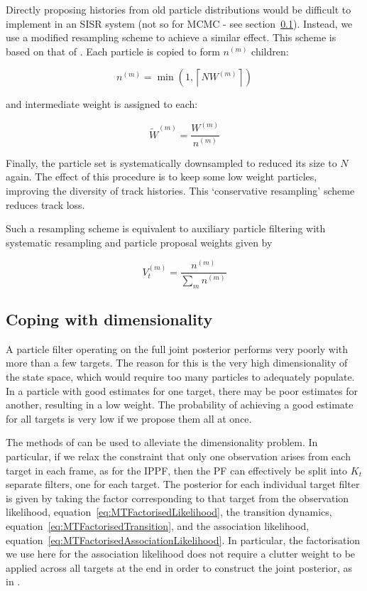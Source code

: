 Directly proposing histories from old particle distributions would be difficult to implement in an SISR system (not so for MCMC - see section~\ref{}). Instead, we use a modified resampling scheme to achieve a similar effect. This scheme is based on that of \cite{Godsill2007}. Each particle is copied to form $n^{(m)}$ children:

\begin{equation}
n^{(m)} = \min(1,\left\lceil N W^{(m)} \right\rceil)
\label{eq:}
\end{equation}

and intermediate weight is assigned to each:

\begin{equation}
\tilde{W}^{(m)} = \frac{W^{(m)}}{n^{(m)}}
\label{eq:}
\end{equation}

Finally, the particle set is systematically downsampled to reduced its size to $N$ again. The effect of this procedure is to keep some low weight particles, improving the diversity of track histories. This `conservative resampling' scheme reduces track loss.

Such a resampling scheme is equivalent to auxiliary particle filtering with systematic resampling and particle proposal weights given by

\begin{equation}
V_t^{(m)} = \frac{n^{(m)}}{\sum_m n^{(m)}}
\label{eq:}
\end{equation}



\subsection{Coping with dimensionality}
A particle filter operating on the full joint posterior performs very poorly with more than a few targets. The reason for this is the very high dimensionality of the state space, which would require too many particles to adequately populate. In a particle with good estimates for one target, there may be poor estimates for another, resulting in a low weight. The probability of achieving a good estimate for all targets is very low if we propose them all at once.

The methods of \cite{Vermaak2005} can be used to alleviate the dimensionality problem. In particular, if we relax the constraint that only one observation arises from each target in each frame, as for the IPPF, then the PF can effectively be split into $K_t$ separate filters, one for each target. The posterior for each individual target filter is given by taking the factor corresponding to that target from the observation likelihood, equation~\ref{eq:MTFactorisedLikelihood}, the transition dynamics, equation~\ref{eq:MTFactorisedTransition}, and the association likelihood, equation~\ref{eq:MTFactorisedAssociationLikelihood}. In particular, the factorisation we use here for the association likelihood does not require a clutter weight to be applied across all targets at the end in order to construct the joint posterior, as in \cite{Vermaak2005}.

